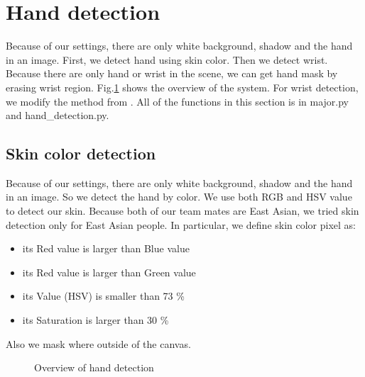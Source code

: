 \section{Hand detection}
Because of our settings, there are only white background, shadow and the hand in an image.
First, we detect hand using skin color. Then we detect wrist. Because there are only hand or wrist in the scene, we can get hand mask by erasing wrist region. Fig.\ref{fig:hand} shows the overview of the system. For wrist detection, we modify the method from \cite{ra11}.
All of the functions in this section is in major.py and hand\_detection.py.

\subsection{Skin color detection}
Because of our settings, there are only white background, shadow and the hand in an image.
So we detect the hand by color. We use both RGB and HSV value to detect our skin.
Because both of our team mates are East Asian, we tried skin detection only for East Asian people.
In particular, we define skin color pixel as:
\begin{itemize}
  \item its Red value is larger than Blue value
  \item its Red value is larger than Green value
  \item its Value (HSV) is smaller than 73 \%
  \item its Saturation is larger than 30 \%
 \end{itemize}
Also we mask where outside of the canvas.
\begin{landscape}
\begin{figure}[htbp]
 \centering
 
 \caption{Overview of hand detection}
 \label{fig:hand}
\end{figure}
\end{landscape}



